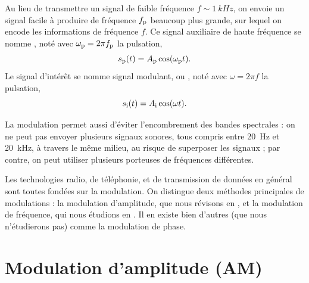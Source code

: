 \begin{liste}
\item  Au lieu de transmettre un signal de faible fréquence $f\sim \SI{1}{kHz}$, on envoie un signal facile à produire
de fréquence $f_{\rm p}$ beaucoup plus grande,
sur lequel on encode les informations de fréquence $f$. Ce signal auxiliaire de haute fréquence se nomme , noté avec $\omega_{\rm p} = 2\pi f_{\rm p}$ la pulsation,
\begin{equation}
s_{\rm p}(t) = 	A_{\rm p} \cos(\omega_{\rm p} t).
\end{equation}
Le signal d’intérêt se nomme signal modulant, ou , noté avec $\omega = 2\pi f$ la pulsation,
\begin{equation}
s_{\rm i}(t) = A_{\rm i} \cos(\omega t).
\end{equation}

\item La modulation permet aussi d’éviter l’encombrement des bandes spectrales : on ne peut pas envoyer plusieurs signaux sonores, tous compris entre \SI{20}{Hz} et \SI{20}{kHz}, à travers le même milieu, au risque de superposer les signaux ; par contre, on peut utiliser plusieurs porteuses de fréquences différentes.
\end{liste}

Les technologies radio, de téléphonie, et de transmission de données en général sont  toutes  fondées sur la modulation.  On distingue deux méthodes principales de modulations : la modulation d’amplitude, que nous révisons en , et la modulation de fréquence, qui nous étudions en . Il en existe bien d'autres (que nous n’étudierons pas) comme la modulation de phase.

\section{Modulation d'amplitude (AM)}
\label{sec:mod_amp}

